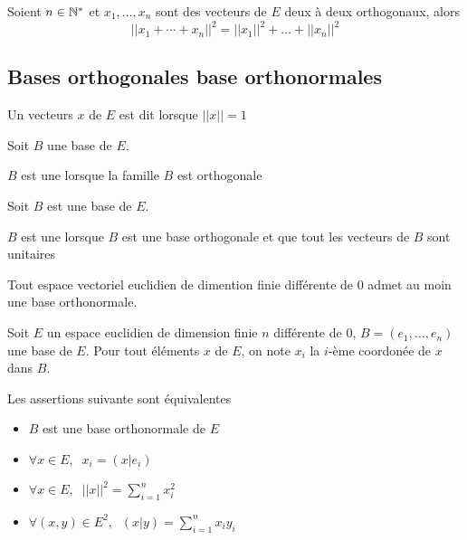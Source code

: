 \begin{thm}
Soient $n \in \mathbb{N}^*$ et $x_1, \ldots, x_n$ sont des vecteurs de $E$ deux
à deux orthogonaux, alors
\[
    || x_1 + \cdots + x_n ||^2 = || x_1 ||^2 + \ldots + || x_n ||^2
\]
\end{thm}

\subsection{Bases orthogonales base orthonormales}

\begin{dfn}
Un vecteurs $x$ de $E$ est dit  lorsque $||x|| = 1$
\end{dfn}

\begin{dfn}
Soit $B$ une base de $E$.

$B$ est une  lorsque la famille $B$ est
orthogonale
\end{dfn}

\begin{dfn}
Soit $B$ est une base de $E$.

$B$ est une  lorsque $B$ est une base orthogonale
et que tout les vecteurs de $B$ sont unitaires
\end{dfn}

\begin{prp}
Tout espace vectoriel euclidien de dimention finie différente de $0$ admet au moin
une base orthonormale.
\end{prp}

\begin{prp}
Soit $E$ un espace euclidien de dimension finie $n$ différente
de $0$, $B = (e_1, \ldots, e_n)$ une base de $E$. Pour tout éléments
$x$ de $E$, on note $x_i$ la $i$-ème coordonée de $x$ dans $B$.

Les assertions suivante sont équivalentes
\begin{itemize}
    \item $B$ est une base orthonormale de $E$
    \item $\forall x \in E, \;\; x_i = (x|e_i)$
    \item $\forall x \in E, \;\; ||x||^2 = \sum^n_{i = 1} x_i^2$
    \item $\forall (x, y) \in E^2, \;\; (x|y) = \sum^n_{i = 1} x_i y_i$
\end{itemize}
\end{prp}

